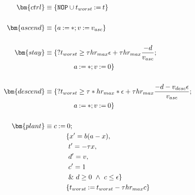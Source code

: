 \documentclass[sigconf,screen]{acmart}
\begin{document}
\begin{align*}
\bm{ctrl} &\equiv \{\texttt{NOP} \cup \humod{t_{worst}}{t}\} \\\\
\bm{ascend} &\equiv \{\humod{a}{*};\humod{v}{v_{asc}} \} \\\\
\bm{stay} &\equiv \{?t_{worst} \ge \tau hr_{max} \epsilon
        + \tau hr_{max}  \frac{-d}{v_{asc}};\\
        &\hspace{1.5cm}\humod{a}{*};\humod{v}{0}\} \\\\
\bm{descend} &\equiv \{?t_{worst} \ge \tau*hr_{max} * \epsilon
        + \tau hr_{max}  \frac{-d - v_{desc}\epsilon}{v_{asc}};\\
        &\hspace{1.5cm}\humod{a}{*}; \humod{v}{0}\} \\\\
\bm{plant} &\equiv  \humod{c}{0}; \\
          &\hspace{1.1cm}\{x' = b(a-x),\\
          &\ \hspace{1.1cm}t' = -\tau x,\\
          &\ \hspace{1.1cm}d' = v,\\
          &\ \hspace{1.1cm}c' = 1 \\
          &\ \hspace{1.1cm}\text{\& } d \ge 0 ~\land~c \le \epsilon\} \\
          &\hspace{1.1cm}\{\humod{t_{worst}}{t_{worst} - \tau hr_{max} c}\} 
\end{align*} 
 
\end{document}

